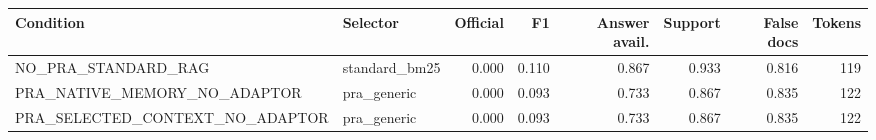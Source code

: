 \begin{tabular}{llrrrrrr}
\toprule
Condition & Selector & Official & F1 & Answer avail. & Support & False docs & Tokens \\
\midrule
NO\_PRA\_STANDARD\_RAG & standard\_bm25 & 0.000 & 0.110 & 0.867 & 0.933 & 0.816 & 119 \\
PRA\_NATIVE\_MEMORY\_NO\_ADAPTOR & pra\_generic & 0.000 & 0.093 & 0.733 & 0.867 & 0.835 & 122 \\
PRA\_SELECTED\_CONTEXT\_NO\_ADAPTOR & pra\_generic & 0.000 & 0.093 & 0.733 & 0.867 & 0.835 & 122 \\
\bottomrule
\end{tabular}

